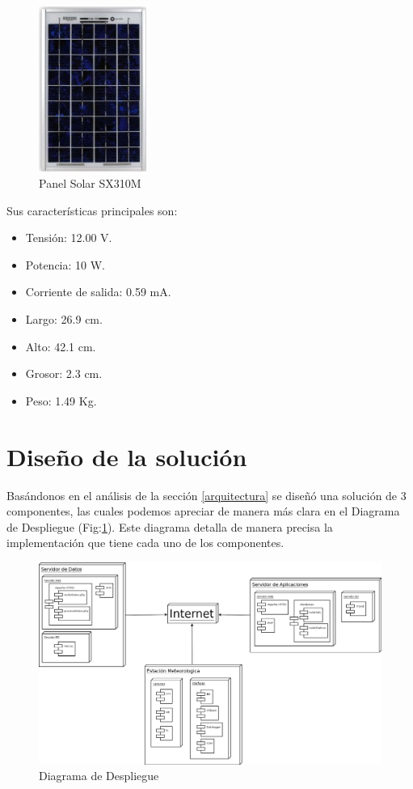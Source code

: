 \begin{figure}[h!]
        \centering
        \includegraphics[width=100pt]{images/panelSolar}
        \caption{Panel Solar SX310M} 
\end{figure}

Sus características principales son:\\

\begin{itemize}
\item Tensión: 12.00 V.
\item Potencia: 10 W.
\item Corriente de salida: 0.59 mA.
\item Largo: 26.9 cm.
\item Alto: 42.1 cm.
\item Grosor: 2.3 cm.
\item Peso: 1.49 Kg.
\end{itemize}

\section{Diseño de la solución}
Basándonos en el análisis de la sección \ref{arquitectura} se diseñó una solución de 3 componentes, las cuales podemos apreciar de manera más clara en el Diagrama de Despliegue (Fig:\ref{diagramaDespliegue}). Este diagrama detalla de manera precisa la implementación que tiene cada uno de los componentes.\\

\begin{figure}[h!]
        \centering
        \includegraphics[scale=0.25]{images/despliegue}
        \caption{Diagrama de Despliegue}
	\label{diagramaDespliegue}
\end{figure}


